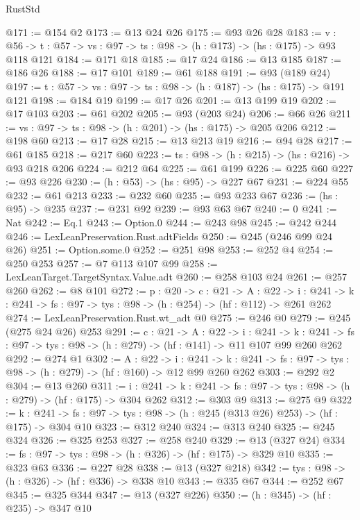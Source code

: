 \begin{lexlean}{RustStd}
\begin{coremodule}
@171 := @154 @2
@173 := @13 @24 @26
@175 := @93 @26 @28
@183 := {v : @56} ->
  {t : @57} -> {vs : @97} -> {ts : @98} -> (h : @173) -> (hs : @175) -> @93 @118 @121
@184 := @171 @18
@185 := @17 @24
@186 := @13 @185
@187 := @186 @26
@188 := @17 @101
@189 := @61 @188
@191 := @93 (@189 @24)
@197 := {t : @57} -> {vs : @97} -> {ts : @98} -> (h : @187) -> (hs : @175) -> @191 @121
@198 := @184 @19
@199 := @17 @26
@201 := @13 @199 @19
@202 := @17 @103
@203 := @61 @202
@205 := @93 (@203 @24)
@206 := @66 @26
@211 := {vs : @97} -> {ts : @98} -> (h : @201) -> (hs : @175) -> @205 @206
@212 := @198 @60
@213 := @17 @28
@215 := @13 @213 @19
@216 := @94 @28
@217 := @61 @185
@218 := @217 @60
@223 := {ts : @98} -> (h : @215) -> (hs : @216) -> @93 @218 @206
@224 := @212 @64
@225 := @61 @199
@226 := @225 @60
@227 := @93 @226
@230 := (h : @53) -> (hs : @95) -> @227 @67
@231 := @224 @55
@232 := @61 @213
@233 := @232 @60
@235 := @93 @233 @67
@236 := (hs : @95) -> @235
@237 := @231 @92
@239 := @93 @63 @67
@240 := 0
@241 := Nat
@242 := Eq.{1}
@243 := Option.{0}
@244 := @243 @98
@245 := @242 @244
@246 := LexLeanPreservation.Rust.adtFields
@250 := @245 (@246 @99 @24 @26)
@251 := Option.some.{0}
@252 := @251 @98
@253 := @252 @4
@254 := @250 @253
@257 := @7 @113 @107 @99
@258 := LexLeanTarget.TargetSyntax.Value.adt
@260 := @258 @103 @24
@261 := @257 @260
@262 := @8 @101
@272 := {p : @20} ->
  {c : @21} ->
  {A : @22} ->
  {i : @241} -> {k : @241} -> {fs : @97} -> {tys : @98} -> (h : @254) -> (hf : @112) -> @261 @262
@274 := LexLeanPreservation.Rust.wt_adt @0
@275 := @246 @0
@279 := @245 (@275 @24 @26) @253
@291 := {c : @21} ->
  {A : @22} ->
  {i : @241} ->
  {k : @241} -> {fs : @97} -> {tys : @98} -> (h : @279) -> (hf : @141) -> @11 @107 @99 @260 @262
@292 := @274 @1
@302 := {A : @22} ->
  {i : @241} ->
  {k : @241} -> {fs : @97} -> {tys : @98} -> (h : @279) -> (hf : @160) -> @12 @99 @260 @262
@303 := @292 @2
@304 := @13 @260
@311 := {i : @241} ->
  {k : @241} -> {fs : @97} -> {tys : @98} -> (h : @279) -> (hf : @175) -> @304 @262
@312 := @303 @9
@313 := @275 @9
@322 := {k : @241} ->
  {fs : @97} -> {tys : @98} -> (h : @245 (@313 @26) @253) -> (hf : @175) -> @304 @10
@323 := @312 @240
@324 := @313 @240
@325 := @245 @324
@326 := @325 @253
@327 := @258 @240
@329 := @13 (@327 @24)
@334 := {fs : @97} -> {tys : @98} -> (h : @326) -> (hf : @175) -> @329 @10
@335 := @323 @63
@336 := @227 @28
@338 := @13 (@327 @218)
@342 := {tys : @98} -> (h : @326) -> (hf : @336) -> @338 @10
@343 := @335 @67
@344 := @252 @67
@345 := @325 @344
@347 := @13 (@327 @226)
@350 := (h : @345) -> (hf : @235) -> @347 @10

\end{coremodule}
\end{lexlean}
